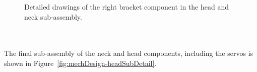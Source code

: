        \begin{figure}[H]
        \centering
        \caption[Detailed drawings of the right bracket component in the head and neck sub-assembly.]{Detailed drawings of the right bracket component in the head and neck sub-assembly.}
        \label{fig:mechDesign-headRightBracket}
        \end{figure}
      
      \\\\
        The final sub-assembly of the neck and head components, including the servos is shown in Figure~\ref{fig:mechDesign-headSubDetail}.
        

